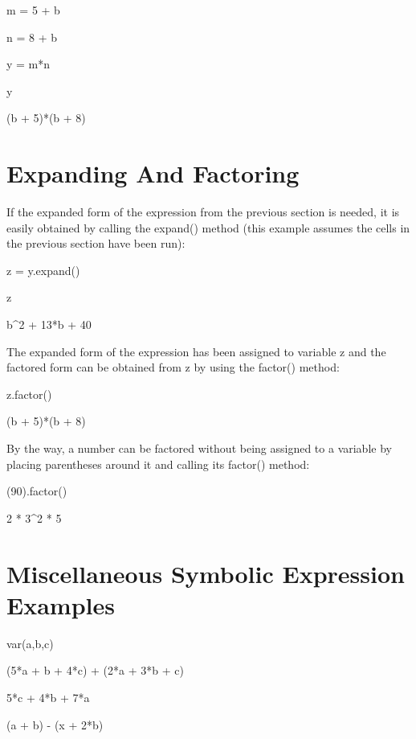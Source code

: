 \documentclass[12pt,twoside]{book}
\begin{document}
\bigskip

m = 5 + b

n = 8 + b

y = m*n

y

{\textbar}

(b + 5)*(b + 8)

\section[Expanding And Factoring]{Expanding And
Factoring}
If the expanded form of the expression from the previous section is
needed, it is easily obtained by calling the expand() method (this
example assumes the cells in the previous section have been run):


\bigskip

z = y.expand()

z

{\textbar}

b\^{}2 + 13*b + 40

The expanded form of the expression has been assigned to variable z and
the factored form can be obtained from z by using the factor() method:


\bigskip

z.factor()

{\textbar}

(b + 5)*(b + 8)

By the way, a number can be factored without being assigned to a
variable by placing parentheses around it and calling its factor()
method:


\bigskip

(90).factor()

{\textbar}

2 * 3\^{}2 * 5

\section[Miscellaneous Symbolic Expression Examples]{
Miscellaneous Symbolic Expression Examples}


\bigskip

var({\textquotesingle}a,b,c{\textquotesingle})


\bigskip

(5*a + b + 4*c) + (2*a + 3*b + c)

{\textbar}

5*c + 4*b + 7*a

(a + b) {}- (x + 2*b)
\end{document}

